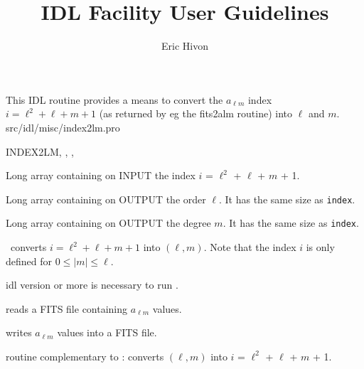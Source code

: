 
\sloppy

\title{\healpix IDL Facility User Guidelines}
 \section[index2lm]{ }
\label{idl:index2lm}
\author{Eric Hivon}

\begin{facility}
{This IDL routine provides a means to convert the $a_{\ell m}$ index $i=\ell^2 +
\ell + m + 1$ (as returned by eg the fits2alm routine) into $\ell$ and $m$.}
{src/idl/misc/index2lm.pro}

\end{facility}


\begin{IDLformat}
{INDEX2LM, 
, 
, 
}
\end{IDLformat}

\begin{qualifiers}
  \begin{qulist}{} %
    \item[index\mytarget{idl:index2lm:index}%
] Long array containing on INPUT the index \hfill\newline
                 $i$ = $\ell^2$ + $\ell$ + $m$ + 1.
    \item[l\mytarget{idl:index2lm:l}%
] Long array containing on OUTPUT the order $\ell$. It has the same
    size as {\tt index}.
    \item[m\mytarget{idl:index2lm:m}%
] Long array containing on OUTPUT the degree $m$. It has the same
    size as {\tt index}.
  \end{qulist}
\end{qualifiers}

\begin{codedescription}
{\thedocid\ converts $i=\ell^2 + \ell + m + 1$ into $(\ell, m)$. Note that the index $i$ is only
defined for $0 \le |m|\le \ell$.
}
\end{codedescription}



\begin{related}
  \begin{sulist}{} %
    \item[idl] version \idlversion or more is necessary to run \thedocid.
    \item[\htmlref{fits2alm}{idl:fits2alm}] reads a FITS file containing
    $a_{\ell m}$ values.
    \item[\htmlref{alm2fits}{idl:alm2fits}] writes $a_{\ell m}$ values into a FITS file.
    \item[\htmlref{lm2index}{idl:lm2index}] routine complementary to \thedocid:
    converts $(\ell, m)$ into $i$ = $\ell^2$ +
    $\ell$ + $m$ + 1.
  \end{sulist}
\end{related}

